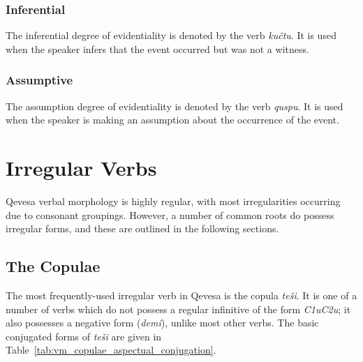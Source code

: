 \documentclass[grammar]{subfiles}
\begin{document}
  \subsubsection{Inferential}
  \label{sssec:vm_evd_inferential}

  The inferential degree of evidentiality is denoted by the verb \textit{kučtu}. It is used when the speaker infers that the event occurred but was not a witness.

  \subsubsection{Assumptive}
  \label{sssec:vm_evd_assumption}

  The assumption degree of evidentiality is denoted by the verb \textit{quspu}. It is used when the speaker is making an assumption about the occurrence of the event.

  \section{Irregular Verbs}
  \label{sec:vm_irregular}

  Qevesa verbal morphology is highly regular, with most irregularities occurring due to consonant groupings. %
  However, a number of common roots do possess irregular forms, and these are outlined in the following sections.

  \subsection{The Copulae}
  \label{ssec:vm_copulae}

  The most frequently-used irregular verb in Qevesa is the copula \textit{teši}. It is one of a number of verbs which do not possess a regular infinitive of the form \textit{C\sub1uC\sub2u}; it also possesses a negative form (\textit{demi}\footnotemark{}), unlike most other verbs. The basic conjugated forms of \textit{teši} are given in Table~\ref{tab:vm_copulae_aspectual_conjugation}.
\end{document}
